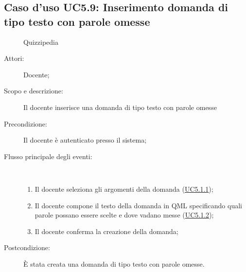 \subsection{Caso d'uso UC5.9: Inserimento domanda di tipo testo con parole omesse}
	\begin{figure}[H]
		\centering
		\begin{resizedtikzpicture}{\textwidth}
		\begin{umlsystem}[x=0, fill=lightgray!20]{Quizzipedia}
		\end{umlsystem}
		\end{resizedtikzpicture}
		\caption{}
	\end{figure}
\begin{description}
\item[Attori:] Docente;
\item[Scopo e descrizione:] Il docente inserisce una domanda di tipo testo con parole omesse
      \item[Precondizione:] Il docente è autenticato presso il sistema;

        \item[Flusso principale degli eventi:] \ 
 \begin{enumerate}
          \item Il docente seleziona gli argomenti della domanda (\hyperlink{UC5.1.1}{UC5.1.1});
          \item Il docente compone il testo della domanda in QML specificando quali parole possano essere scelte e dove vadano messe  (\hyperlink{UC5.1.2}{UC5.1.2});
          \item Il docente conferma la creazione della domanda;

      \end{enumerate}
    \item[Postcondizione:] È stata creata una domanda di tipo testo con parole omesse.
  \end{description}
\hypertarget{UC5.10}{}
